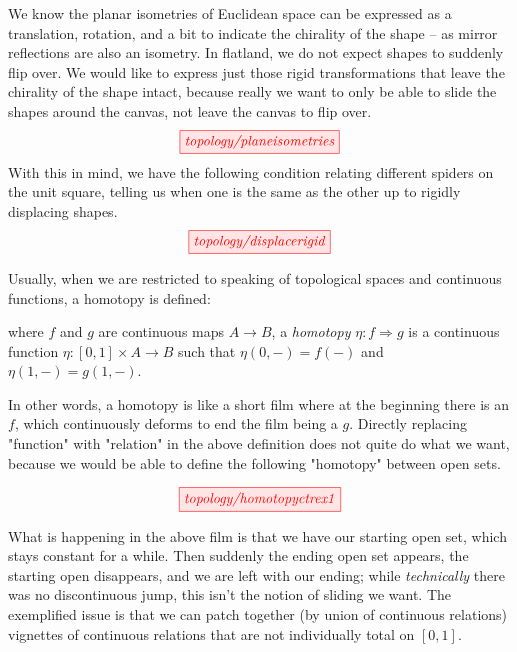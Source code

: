 \begin{myboxB}
\begin{defn}\label{defn:planarisometry}
We know the planar isometries of Euclidean space can be expressed as a translation, rotation, and a bit to indicate the chirality of the shape -- as mirror reflections are also an isometry. In flatland, we do not expect shapes to suddenly flip over. We would like to express just those rigid transformations that leave the chirality of the shape intact, because really we want to only be able to slide the shapes around the canvas, not leave the canvas to flip over.
\[\tikzfig{topology/planeisometries}\]
With this in mind, we have the following condition relating different spiders on the unit square, telling us when one is the same as the other up to rigidly displacing shapes.
\[\tikzfig{topology/displacerigid}\]
\end{defn}
\end{myboxB}

\begin{myboxR}
\begin{remark}\label{remark:homotopywrinkle}
Usually, when we are restricted to speaking of topological spaces and continuous functions, a homotopy is defined:
\end{remark}

\begin{defn}
where $f$ and $g$ are continuous maps $A \rightarrow B$, a \emph{homotopy} $\eta : f \Rightarrow g$ is a continuous function $\eta : [0,1] \times A \rightarrow B$ such that $\eta(0,-) = f(-)$ and $\eta(1,-) = g(1,-)$.
\end{defn}

In other words, a homotopy is like a short film where at the beginning there is an $f$, which continuously deforms to end the film being a $g$. Directly replacing "function" with "relation" in the above definition does not quite do what we want, because we would be able to define the following "homotopy" between open sets.

\[\tikzfig{topology/homotopyctrex1}\]

What is happening in the above film is that we have our starting open set, which stays constant for a while. Then suddenly the ending open set appears, the starting open disappears, and we are left with our ending; while \emph{technically} there was no discontinuous jump, this isn't the notion of sliding we want. The exemplified issue is that we can patch together (by union of continuous relations) vignettes of continuous relations that are not individually total on $[0,1]$.
\end{myboxR}

